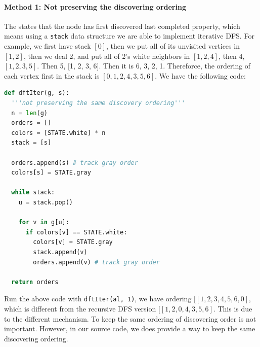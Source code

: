 \documentclass[main.tex]{subfiles}
\begin{document}
\paragraph{Method 1: Not preserving the discovering ordering}

The states that the node has first discovered last completed property, which means using a \texttt{stack} data structure we are able to implement iterative DFS.
For example, we first have stack $[0]$, then we put all of its unvisited vertices in $[1, 2]$, then we deal 2, and put all of 2's white neighbors in $[1, 2, 4]$, then 4, $[1, 2, 3, 5]$. Then 5, [1, 2, 3, 6]. Then it is 6, 3, 2, 1. Thereforce, the ordering of each vertex first in the stack is $[0, 1, 2, 4, 3, 5, 6]$. We have the following code:
\begin{lstlisting}[language=Python]
def dftIter(g, s):
  '''not preserving the same discovery ordering'''
  n = len(g)
  orders = []
  colors = [STATE.white] * n
  stack = [s]

  orders.append(s) # track gray order
  colors[s] = STATE.gray
        
  while stack:
    u = stack.pop()
    
    for v in g[u]:
      if colors[v] == STATE.white:
        colors[v] = STATE.gray
        stack.append(v)
        orders.append(v) # track gray order
    
  return orders
\end{lstlisting}
Run the above code with \texttt{dftIter(al, 1)}, we have ordering $[[1, 2, 3, 4, 5, 6, 0]$, which is different from the recursive DFS version $[[1, 2, 0, 4, 3, 5, 6]$. This is due to the different mechanism. To keep the same ordering of discovering order is not important. However, in our source code, we does provide a way to keep the same discovering ordering. 
\end{document}
